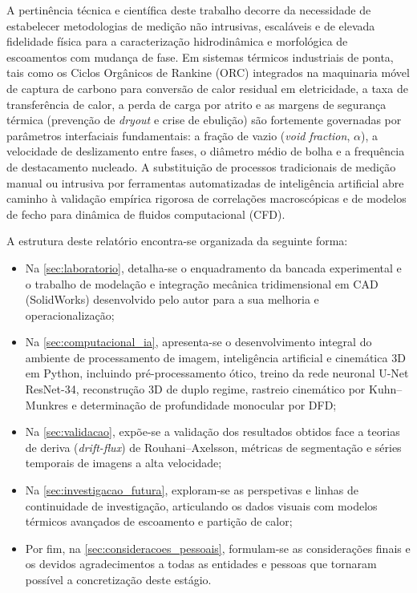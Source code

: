A pertinência técnica e científica deste trabalho decorre da necessidade de estabelecer metodologias de medição não intrusivas, escaláveis e de elevada fidelidade física para a caracterização hidrodinâmica e morfológica de escoamentos com mudança de fase. Em sistemas térmicos industriais de ponta, tais como os Ciclos Orgânicos de Rankine (ORC) integrados na maquinaria móvel de captura de carbono para conversão de calor residual em eletricidade, a taxa de transferência de calor, a perda de carga por atrito e as margens de segurança térmica (prevenção de \emph{dryout} e crise de ebulição) são fortemente governadas por parâmetros interfaciais fundamentais: a fração de vazio (\emph{void fraction}, $\alpha$), a velocidade de deslizamento entre fases, o diâmetro médio de bolha e a frequência de destacamento nucleado. A substituição de processos tradicionais de medição manual ou intrusiva por ferramentas automatizadas de inteligência artificial abre caminho à validação empírica rigorosa de correlações macroscópicas e de modelos de fecho para dinâmica de fluidos computacional (CFD).

A estrutura deste relatório encontra-se organizada da seguinte forma:
\begin{itemize}
    \item Na \autoref{sec:laboratorio}, detalha-se o enquadramento da bancada experimental e o trabalho de modelação e integração mecânica tridimensional em CAD (SolidWorks\textregistered) desenvolvido pelo autor para a sua melhoria e operacionalização;
    \item Na \autoref{sec:computacional_ia}, apresenta-se o desenvolvimento integral do ambiente de processamento de imagem, inteligência artificial e cinemática 3D em Python, incluindo pré-processamento ótico, treino da rede neuronal U-Net ResNet-34, reconstrução 3D de duplo regime, rastreio cinemático por Kuhn--Munkres e determinação de profundidade monocular por DFD;
    \item Na \autoref{sec:validacao}, expõe-se a validação dos resultados obtidos face a teorias de deriva (\emph{drift-flux}) de Rouhani--Axelsson, métricas de segmentação e séries temporais de imagens a alta velocidade;
    \item Na \autoref{sec:investigacao_futura}, exploram-se as perspetivas e linhas de continuidade de investigação, articulando os dados visuais com modelos térmicos avançados de escoamento e partição de calor;
    \item Por fim, na \autoref{sec:consideracoes_pessoais}, formulam-se as considerações finais e os devidos agradecimentos a todas as entidades e pessoas que tornaram possível a concretização deste estágio.
\end{itemize}

